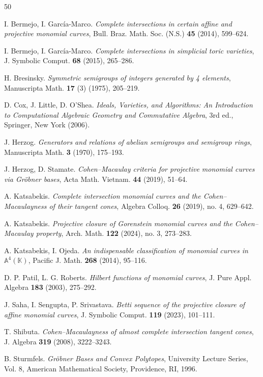 \documentclass[10pt]{amsart}
\begin{document}
\begin{thebibliography}{50}

 I. Bermejo, I. Garc\'ia-Marco.
{\em Complete intersections in certain affine and projective monomial curves},
Bull. Braz. Math. Soc. (N.S.) {\bf 45} (2014), 599--624.

 I. Bermejo, I. Garc\'ia-Marco.
{\em Complete intersections in simplicial toric varieties},
J. Symbolic Comput. {\bf 68} (2015), 265--286.

 H. Bresinsky.
{\em Symmetric semigroups of integers generated by 4 elements},
Manuscripta Math. {\bf 17} (3) (1975), 205--219.

 D. Cox, J. Little, D. O’Shea.
{\em Ideals, Varieties, and Algorithms: An Introduction to Computational Algebraic Geometry and Commutative Algebra},
3rd ed., Springer, New York (2006).

 J. Herzog.
{\em Generators and relations of abelian semigroups and semigroup rings},
Manuscripta Math. {\bf 3} (1970), 175--193.

 J. Herzog, D. Stamate.
{\em Cohen--Macaulay criteria for projective monomial curves via Gr\"obner bases},
Acta Math. Vietnam. {\bf 44} (2019), 51--64.

 A. Katsabekis.
{\em Complete intersection monomial curves and the Cohen--Macaulayness of their tangent cones},
Algebra Colloq. {\bf 26} (2019), no. 4, 629--642.

 A. Katsabekis.
{\em Projective closure of Gorenstein monomial curves and the Cohen--Macaulay property},
Arch. Math. {\bf 122} (2024), no. 3, 273--283.

 A. Katsabekis, I. Ojeda.
{\em An indispensable classification of monomial curves in $\mathbb{A}^{4}(\mathbb{K})$},
Pacific J. Math. {\bf 268} (2014), 95--116.

 D. P. Patil, L. G. Roberts. {\em Hilbert functions of monomial curves}, J. Pure Appl. Algebra {\bf 183} (2003), 275--292.

 J. Saha, I. Sengupta, P. Srivastava.
{\em Betti sequence of the projective closure of affine monomial curves},
J. Symbolic Comput. {\bf 119} (2023), 101--111.

 T. Shibuta.
{\em Cohen--Macaulayness of almost complete intersection tangent cones},
J. Algebra {\bf 319} (2008), 3222--3243.

 B. Sturmfels.
{\em Gr\"obner Bases and Convex Polytopes},
University Lecture Series, Vol. 8,
American Mathematical Society, Providence, RI, 1996.

	
\end{thebibliography}
\end{document}
